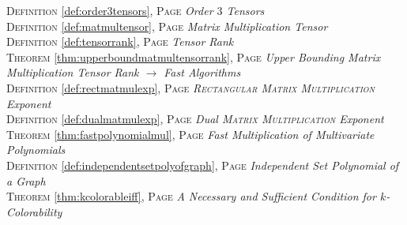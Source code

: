 \begin{multicols}{2}
{\textsc{Definition} \ref{def:order3tensors}, \textsc{Page} \pageref{def:order3tensors} \textit{Order \(3\) Tensors} \\
\textsc{Definition} \ref{def:matmultensor}, \textsc{Page} \pageref{def:matmultensor} \textit{Matrix Multiplication Tensor} \\
\textsc{Definition} \ref{def:tensorrank}, \textsc{Page} \pageref{def:tensorrank} \textit{Tensor Rank} \\
\textsc{Theorem} \ref{thm:upperboundmatmultensorrank}, \textsc{Page} \pageref{thm:upperboundmatmultensorrank} \textit{Upper Bounding Matrix Multiplication Tensor Rank \(\to \) Fast Algorithms} \\
\textsc{Definition} \ref{def:rectmatmulexp}, \textsc{Page} \pageref{def:rectmatmulexp} \textit{\textsc {Rectangular Matrix Multiplication} Exponent} \\
\textsc{Definition} \ref{def:dualmatmulexp}, \textsc{Page} \pageref{def:dualmatmulexp} \textit{Dual \textsc {Matrix Multiplication} Exponent} \\
\textsc{Theorem} \ref{thm:fastpolynomialmul}, \textsc{Page} \pageref{thm:fastpolynomialmul} \textit{Fast Multiplication of Multivariate Polynomials} \\
\textsc{Definition} \ref{def:independentsetpolyofgraph}, \textsc{Page} \pageref{def:independentsetpolyofgraph} \textit{Independent Set Polynomial of a Graph} \\
\textsc{Theorem} \ref{thm:kcolorableiff}, \textsc{Page} \pageref{thm:kcolorableiff} \textit{A Necessary and Sufficient Condition for \(k\)-Colorability} \\

      }
\end{multicols}

